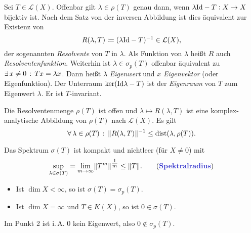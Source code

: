 \documentclass{cheat-sheet}
\newcommand{\LSO}{\mathcal{L}} %
\newcommand{\dist}{\mathrm{dist}} %
\begin{document}
\begin{bem}
  Sei $T \in \LSO(X)$. Offenbar gilt $\lambda \in \rho(T)$ genau dann, wenn $\lambda \mathrm{Id} - T : X \to X$ bijektiv ist. Nach dem Satz von der inversen Abbildung ist dies äquivalent zur Existenz von
  \[ R(\lambda, T) \coloneqq (\lambda \mathrm{Id} - T)^{-1} \in \mathcal{L}(X), \]
  der sogenannten \emph{Resolvente} von $T$ in $\lambda$. Als Funktion von $\lambda$ heißt $R$ auch \emph{Resolventenfunktion}. Weiterhin ist $\lambda \in \sigma_p(T)$ offenbar äquivalent zu $\exists \, {x \not= 0} \,:\, Tx = \lambda x$. Dann heißt $\lambda$ \emph{Eigenwert} und $x$ \emph{Eigenvektor} (oder Eigenfunktion). Der Unterraum $\ker(\mathrm{Id} \lambda - T)$ ist der \emph{Eigenraum} von $T$ zum Eigenwert $\lambda$. Er ist $T$-invariant.
\end{bem}

\begin{satz}
  Die Resolventenmenge $\rho(T)$ ist offen und $\lambda \mapsto R(\lambda, T)$ ist eine komplex-analytische Abbildung von $\rho(T)$ nach $\mathcal{L}(X)$. Es gilt
  \[ \fa{\lambda \in \rho(T)} \norm{R(\lambda, T)}^{-1} \leq \dist(\lambda, \rho(T)). \]
\end{satz}

\begin{satz}
  Das Spektrum $\sigma(T)$ ist kompakt und nichtleer (für $X {\not=} 0$) mit
  \[ \sup_{\lambda \in \sigma(T)} = \lim_{m \to \infty} \norm{T^m}^{\tfrac{1}{m}} \leq \norm{T}. \tag*{(\emph{Spektralradius})} \]
\end{satz}


\begin{lem}
  \begin{itemize}
    \item Ist $\dim X < \infty$, so ist $\sigma(T) = \sigma_p(T)$.
    \item Ist $\dim X = \infty$ und $T \in K(X)$, so ist $0 \in \sigma(T)$.
  \end{itemize}
\end{lem}

\begin{bem}
  Im Punkt 2 ist i.\,A. $0$ kein Eigenwert, also $0 \not\in \sigma_p(T)$.
\end{bem}

\end{document}
